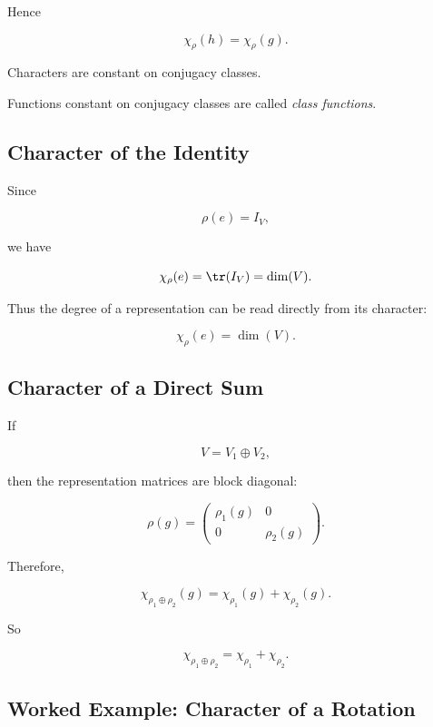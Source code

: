 Hence

\[ \chi_\rho(h)=\chi_\rho(g). \]

\begin{theorem}
Characters are constant on conjugacy classes.
\end{theorem}

Functions constant on conjugacy classes are called \emph{class functions}.

\subsection{Character of the Identity}
\label{subsec:character-identity}

Since

\[ \rho(e)=I_V, \]

we have

\[ \chi_\rho(e)=\tr(I_V)=\dim(V). \]

Thus the degree of a representation can be read directly from its character:

\[ \boxed{\chi_\rho(e)=\dim(V).} \]

\subsection{Character of a Direct Sum}
\label{subsec:character-direct-sum}

If

\[ V=V_1\oplus V_2, \]

then the representation matrices are block diagonal:

\[ \rho(g)=
\begin{pmatrix}
\rho_1(g)&0\\
0&\rho_2(g)
\end{pmatrix}. \]

Therefore,

\[ \chi_{\rho_1\oplus\rho_2}(g)
=\chi_{\rho_1}(g)+\chi_{\rho_2}(g). \]

So

\[ \boxed{\chi_{\rho_1\oplus\rho_2}=\chi_{\rho_1}+\chi_{\rho_2}.} \]

\subsection{Worked Example: Character of a Rotation}
\label{subsec:worked-character-rotation}

